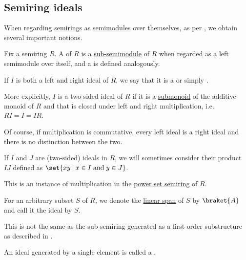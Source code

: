 \subsection{Semiring ideals}\label{subsec:semiring_ideals}

When regarding \hyperref[def:semiring]{semirings} as \hyperref[def:semimodule]{semimodules} over themselves, as per , we obtain several important notions.

\begin{definition}\label{def:semiring_ideal}\mimprovised
  Fix a semiring \( R \). A  of \( R \) is a \hyperref[def:semimodule/submodel]{sub-semimodule} of \( R \) when regarded as a left semimodule over itself, and a  is defined analogously.

  If \( I \) is both a left and right ideal of \( R \), we say that it is a  or simply .

  More explicitly, \( I \) is a two-sided ideal of \( R \) if it is a \hyperref[def:monoid/submodel]{submonoid} of the additive monoid of \( R \) and that is closed under left and right multiplication, i.e. \( RI = I = IR \).

  Of course, if multiplication is commutative, every left ideal is a right ideal and there is no distinction between the two.

  \begin{thmenum}
     If \( I \) and \( J \) are (two-sided) ideals in \( R \), we will sometimes consider their product \( IJ \) defined as \( \set{ xy \given x \in I \T{and} y \in J } \).

    This is an instance of multiplication in the \hyperref[def:magma/power_set]{power set semiring} of \( R \).

     For an arbitrary subset \( S \) of \( R \), we denote the \hyperref[def:semimodule/submodel]{linear span} of \( S \) by \( \braket{ A } \) and call it the ideal  by \( S \).

    This is not the same as the sub-semiring generated as a first-order substructure as described in .

     An ideal generated by a single element is called a .
  \end{thmenum}
\end{definition}

